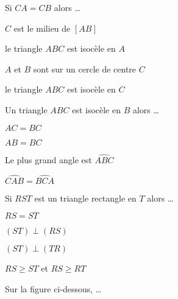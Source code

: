 \begin{QCM}
  \begin{GroupeQCM} 
    \begin{exercice}
      Si $CA = CB$ alors \ldots
      \begin{ChoixQCM}{4}
      \item $C$ est le milieu de $[AB]$
      \item le triangle $ABC$ est isocèle en $A$
      \item $A$ et $B$ sont sur un cercle de centre $C$
      \item le triangle $ABC$ est isocèle en $C$
      \end{ChoixQCM}
\begin{corrige}
   \end{corrige}
    \end{exercice}
    

    \begin{exercice}
      Un triangle $ABC$ est isocèle en $B$ alors \ldots
      \begin{ChoixQCM}{4}
      \item $AC = BC$
      \item $AB = BC$
      \item Le plus grand angle est $\widehat{ABC}$
      \item $\widehat{CAB} = \widehat{BCA}$
      \end{ChoixQCM}
\begin{corrige}
   \end{corrige}
    \end{exercice}


    \begin{exercice}
      Si $RST$ est un triangle rectangle en $T$ alors \ldots
      \begin{ChoixQCM}{4}
      \item $RS = ST$
      \item $(ST) \perp (RS)$
      \item $(ST) \perp (TR)$
      \item $RS \geqslant ST$ et $RS \geqslant RT$
      \end{ChoixQCM}
\begin{corrige}
   \end{corrige}
    \end{exercice}
    

    \begin{exercice}
      Sur la figure ci‑dessous, \ldots
      

\end{exercice}
\end{GroupeQCM}
\end{QCM}
